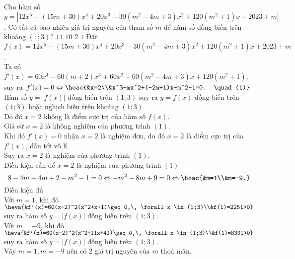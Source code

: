 \begin{ex}%
Cho hàm số $y=\left|12x^5-(15m+30)x^4+20x^3-30(m^2-4m+3)x^2+120(m^2+1)x+2023+m\right|$.
Có tất cả bao nhiêu giá trị nguyên của tham số $m$ để hàm số đồng biến trên khoảng $(1;3)$?
\choice
{$11$}
{$10$}
{\True $2$}
{$1$}
\loigiai
{Đặt $f(x)=12x^5-(15m+30)x^4+20x^3-30(m^2-4m+3)x^2+120(m^2+1)x+2023+m$.\\
Ta có $f'(x)=60x^4-60(m+2)x^3+60x^2-60(m^2-4m+3)x+120(m^2+1)$,\\
suy ra $f'(x)=0\Leftrightarrow\hoac{&x=2\\&x^3-mx^2+(-2m+1)x-m^2-1=0. \quad (1)}$ \\
Hàm số $y = |f(x)|$ đồng biến trên $(1;3)$ suy ra $y =f(x)$ đồng biến trên $(1;3)$ hoặc nghịch biến trên khoảng $(1;3)$.\\
Do đó $x=2$ không là điểm cực trị của hàm số $f(x)$. \\
Giả sử $x=2$ là không nghiệm của phương trình $(1)$.\\
Khi đó $f'(x)=0$ nhận $x=2$ là nghiệm đơn, do đó $x=2$ là điểm cực trị của $f'(x)$, dẫn tới vô lí. \\
Suy ra $x=2$ là nghiệm của phương trình $(1)$. \\
Điều kiện cần để $x = 2$ là nghiệm của phương trình $(1)$\\
\[8-4m-4m+2-m^2-1=0\Leftrightarrow-m^2-8m+9=0\Leftrightarrow\hoac{&m=1\\&m=-9.}\]
Điều kiện đủ\\
Với $m=1$, khi đó $\heva{&f'(x)=60(x-2)^2(x^2+x+1)\geq 0,\, \forall x \in (1;3)\\&f(1)=2251>0}$ suy ra hàm số $y = |f(x)|$ đồng biến trên $(1;3)$.\\
Với $m =-9$, khi đó $\heva{&f'(x)=60(x-2)^2(x^2+11x+41)\geq 0,\, \forall x \in (1;3)\\&f(1)=8391>0}$ suy ra hàm số $y = |f(x)|$ đồng biến trên $(1;3)$.\\
Vây $m = 1; m =-9$ nên có $2$ giá trị nguyên của $m$ thoả mãn.
}
\end{ex}

